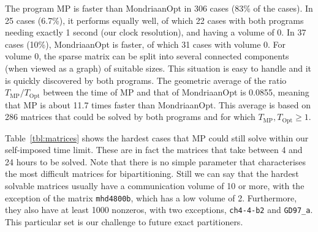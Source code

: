 The program MP is faster than MondriaanOpt in 306 cases (83\% of the cases).
In 25 cases (6.7\%), it performs equally well, of which 22 cases with both programs needing exactly
1 second (our clock resolution), and having a volume of 0.
In 37 cases (10\%), MondriaanOpt is faster, of which 31 cases with volume 0.
For volume 0, the sparse matrix can be split into several connected components
(when viewed as a graph) of suitable sizes. This situation is easy to handle
and it is quickly discovered by both programs.
The geometric average of the ratio $T_{\mathrm{MP}} / T_{\mathrm{Opt}}$
between the time of MP and that of MondriaanOpt is 0.0855, meaning that MP is about 11.7 times faster
than MondriaanOpt.
This average is based on 286 matrices that could be solved by both programs and for which $T_{\mathrm{MP}}, T_{\mathrm{Opt}}  \geq 1$.

Table~\ref{tbl:matrices} shows the hardest cases that MP could still
solve within our self-imposed time limit.
These are in fact the matrices that take between 4 and 24 hours to be solved.
Note that there is no simple parameter that characterises the most difficult  matrices
for bipartitioning. Still we can say 
that the hardest solvable matrices usually have a communication volume of 10 or more,
with the exception
of the matrix \texttt{mhd4800b}, which has a low volume of 2.
Furthermore, they also have at least 1000 nonzeros, with two exceptions, \texttt{ch4-4-b2}
and \texttt{GD97\_a}. This particular set is our challenge to future exact partitioners.


